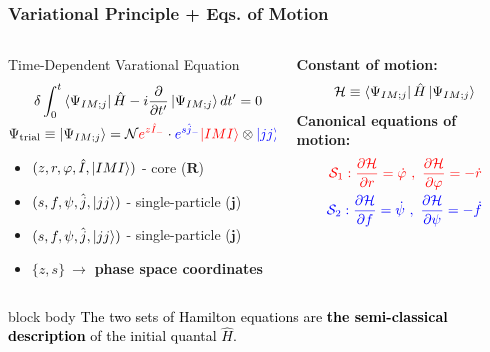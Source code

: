 \documentclass{beamer}
\begin{document}
\begin{frame}
	\frametitle{Variational Principle + Eqs. of Motion}
	\begin{columns}
		\begin{column}{0.6\textwidth}
			\begin{exampleblock}{Time-Dependent Varational Equation}
				\begin{align}
					\delta&\int_0^t\bra{\Psi_{IM;j}}\hat{H}-i\frac{\partial}{\partial t'}\ket{\Psi_{IM;j}}dt'=0\nonumber\\
					\Psi_\text{trial}&\equiv\ket{\Psi_{IM;j}}=\mathcal{N}{\color{red}e^{z\hat{I}_-}}\cdot{\color{blue}e^{s\hat{j}_-}}{\color{red}\ket{IMI}}\otimes{\color{blue}\ket{jj}}\nonumber
				\end{align}
				\vspace{-0.4cm}
				\begin{itemize}
					\item {\color{red}$(z,r,\varphi,\hat{I},\ket{IMI})$} - core ({\color{red}$\mathbf{R}$})
					\item {\color{blue}$(s,f,\psi,\hat{j},\ket{jj})$} - single-particle ({\color{blue}$\mathbf{j}$})
					\item {\color{blue}$(s,f,\psi,\hat{j},\ket{jj})$} - single-particle ({\color{blue}$\mathbf{j}$})
					\item $\{z,s\}\ \rightarrow$ \textbf{phase space coordinates}
				\end{itemize}
			\end{exampleblock}
		\end{column}
		\begin{column}{0.4\textwidth}
			\textbf{Constant of motion:}
			\begin{align}
				\mathcal{H}\equiv\bra{\Psi_{IM;j}}\hat{H}\ket{\Psi_{IM;j}}\nonumber
			\end{align}
			\textbf{Canonical equations of motion:}
			\begin{align}
				{\color{red}\mathcal{S}_1: \frac{\partial \mathcal{H}}{\partial r}=\dot{\varphi}\ ,\ \frac{\partial \mathcal{H}}{\partial \varphi}=-\dot{r}}\nonumber\\
				{\color{blue}\mathcal{S}_2: \frac{\partial \mathcal{H}}{\partial f}=\dot{\psi}\ ,\ \frac{\partial \mathcal{H}}{\partial \psi}=-\dot{f}}\nonumber
			\end{align}
		\end{column}
	\end{columns}
	\begin{beamercolorbox}[rounded=true,shadow=false, wd=\linewidth,]{block body}
		\centering
		\textcolor{black}{\small{The two sets of Hamilton equations are \textbf{the semi-classical description} of the initial quantal $\hat{H}$.}}
	\end{beamercolorbox}
\end{frame}
\end{document}

